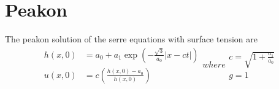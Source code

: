 \documentclass[10pt]{elsarticle}
\begin{document}
\section{Peakon}
The peakon solution of the serre equations with surface tension are
\begin{subequations}
	\begin{align}
	h(x,0) &= a_0 + a_1\exp\left(-\frac{\sqrt{3}}{a_0} \left|x - ct\right|\right) \\
	u(x,0) &= c \left(\frac{h(x,0) - a_0}{h(x,0)}\right)
	\end{align}
	where
	\begin{align}
	c = \sqrt{1 + \frac{a_1}{a_0}} \\
	g= 1                                                                                                                                                                                                                                                                                                                                                                                                                                                                                                                                                                                                                                                                                                                                                                                                                                                                                                                                                                                                                                                                                                                                                                                                                                                                                                                                                                                                                                                                                                                                                                                                                                                                                                                                                                                                                                                                                                                                                                                                                                                                                                                                                                                                                                                                                                                                                                                                                                                                                                                                                                                                                                                                                
\end{align}
\end{subequations}
\end{document}
